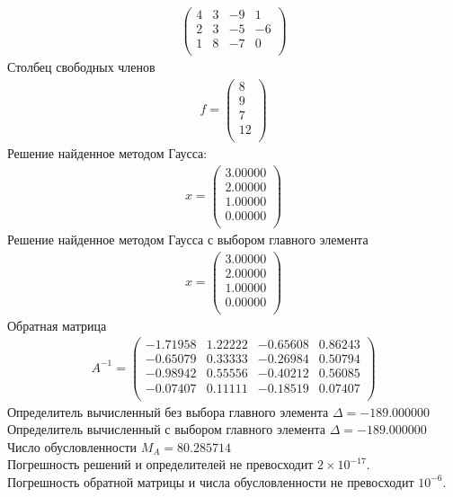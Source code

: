 \documentclass[a4paper,12pt,titlepage,finall]{article}
\begin{document}
\begin{enumerate}
\begin{align*}
\begin{pmatrix}
         4&           3&          -9&           1 \\
         2&           3&          -5&          -6 \\
         1&           8&          -7&           0 \\
\end{pmatrix}
\end{align*}
Столбец свободных членов
\begin{align*}
f = \begin{pmatrix}
8 \\
         9 \\
         7 \\
        12 \\
\end{pmatrix}
\end{align*}
Решение найденное методом Гаусса:
\begin{align*}
x = \begin{pmatrix}
3.00000 \\
   2.00000 \\
   1.00000 \\
   0.00000 \\
\end{pmatrix}
\end{align*}
Решение найденное методом Гаусса с выбором главного элемента
\begin{align*}
x = \begin{pmatrix}
3.00000 \\
   2.00000 \\
   1.00000 \\
   0.00000 \\
\end{pmatrix}
\end{align*}
Обратная матрица
\begin{align*}
A^{-1} = \begin{pmatrix}
  -1.71958&     1.22222&    -0.65608&     0.86243 \\
  -0.65079&     0.33333&    -0.26984&     0.50794 \\
  -0.98942&     0.55556&    -0.40212&     0.56085 \\
  -0.07407&     0.11111&    -0.18519&     0.07407 \\
\end{pmatrix}
\end{align*}
Определитель вычисленный без выбора главного элемента  $\Delta = -189.000000$\\
Определитель вычисленный с выбором главного элемента $\Delta = -189.000000$\\
Число обусловленности $M_A = 80.285714$\\
Погрешность решений и определителей не превосходит $2 \times 10^{-17}$.\\
Погрешность обратной матрицы и числа обусловленности не превосходит $10^{-6}$.


\end{enumerate}
\end{document}
